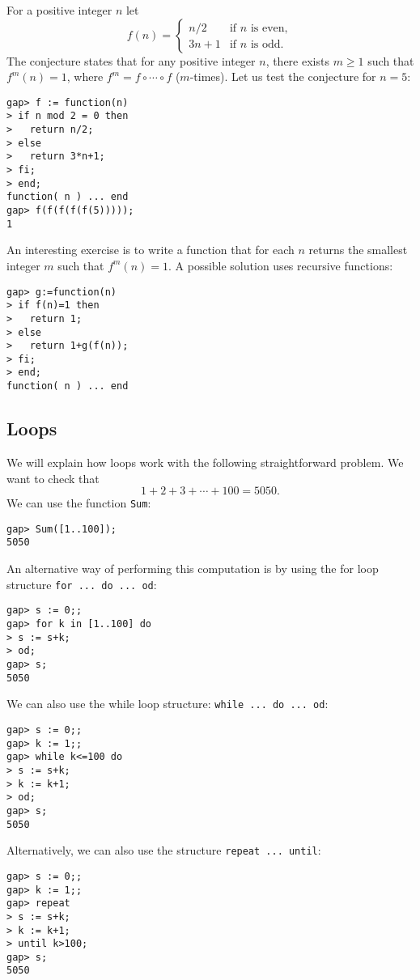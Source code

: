 \begin{example}
	\label{example:Collatz}
	For a positive integer $n$ let 
	\[
		f(n)=\begin{cases}
			n/2 & \text{if $n$ is even},\\
			3n+1 & \text{if $n$ is odd}.
		\end{cases}
	\]
	The conjecture states that for any positive integer $n$, there exists  
	$m\geq1$ such that $f^m(n)=1$, where $f^m=f\circ\cdots\circ f$ ($m$-times).
	Let us test the conjecture for $n=5$:
\begin{lstlisting}
gap> f := function(n)
> if n mod 2 = 0 then
>   return n/2;
> else 
>   return 3*n+1;
> fi;
> end;
function( n ) ... end
gap> f(f(f(f(f(5)))));
1
\end{lstlisting}

An interesting exercise is to 
write a function that for each $n$ returns the smallest integer $m$ such that $f^m(n)=1$. A possible solution uses recursive functions:
\begin{lstlisting}
gap> g:=function(n)
> if f(n)=1 then
>   return 1;
> else
>   return 1+g(f(n));
> fi;
> end;
function( n ) ... end
\end{lstlisting}
\end{example}



\subsection{Loops}
\label{page:do}
We will explain how loops work with the following 
straightforward problem. We
want to check that 
\[
    1+2+3+\cdots+100=5050.
\]
We can use the function \lstinline{Sum}:
\begin{lstlisting}
gap> Sum([1..100]);
5050
\end{lstlisting}
An alternative way of performing this computation
is by using the for loop structure \lstinline{for ... do ... od}:
\begin{lstlisting}
gap> s := 0;;
gap> for k in [1..100] do
> s := s+k;
> od;
gap> s;
5050
\end{lstlisting}
We can also use the while loop structure:
\lstinline{while ... do ... od}:
\begin{lstlisting}
gap> s := 0;;
gap> k := 1;;
gap> while k<=100 do
> s := s+k;
> k := k+1;
> od;
gap> s;
5050
\end{lstlisting}
Alternatively, we can also use the structure 
\lstinline{repeat ... until}:
\begin{lstlisting}
gap> s := 0;;
gap> k := 1;;
gap> repeat
> s := s+k;
> k := k+1;
> until k>100;
gap> s;
5050
\end{lstlisting}

